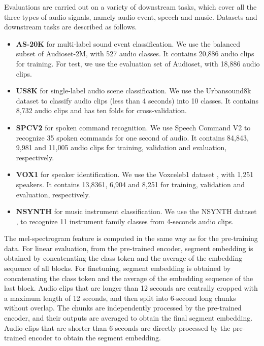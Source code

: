 Evaluations are carried out on a variety of downstream tasks, which cover all the three types of audio signals, namely audio event, speech and music. Datasets and downstream tasks are described as follows.
\begin{itemize}[leftmargin=*,itemsep=0pt]
\item \textbf{AS-20K} for multi-label sound event classification. We use the balanced subset of Audioset-2M, with 527 audio classes. It contains 20,886 audio clips for training. For test, we use the evaluation set of Audioset, with 18,886 audio clips. 
\item \textbf{US8K} for single-label audio scene classification. We use the Urbansound8k dataset \cite{salamon2014dataset} to classify audio clips (less than 4 seconds) into 10 classes. It contains 8,732 audio clips and has ten folds for cross-validation.
\item \textbf{SPCV2} for spoken command recognition. We use Speech Command V2 \cite{warden2018speech} to recognize 35 spoken commands for one second of audio. It contains 84,843, 9,981 and 11,005 audio clips for training, validation and evaluation, respectively.
\item \textbf{VOX1} for speaker identification. We use the Voxceleb1 dataset \cite{nagrani2017voxceleb}, with 1,251 speakers. It contains 13,8361, 6,904 and 8,251 for training, validation and evaluation, respectively.
\item \textbf{NSYNTH} for music instrument classification. We use the NSYNTH dataset \cite{engel2017neural}, to recognize 11 instrument family classes from 4-seconds audio clips.
\end{itemize}

The mel-spectrogram feature is computed in the same way as for the pre-training data.  For linear evaluation, from the pre-trained encoder, segment embedding is obtained by concatenating the class token  and the average of the embedding sequence of all blocks. For finetuning, segment embedding is obtained by concatenating the class token and the average of the embedding sequence of the last block. Audio clips that are longer than 12 seconds are centrally cropped with a maximum length of 12 seconds, and then split into 6-second long chunks without overlap. The chunks are independently processed by the pre-trained encoder, and their outputs are averaged to obtain the final segment embedding. Audio clips that are shorter than 6 seconds are directly processed by the pre-trained encoder to obtain the segment embedding.  

